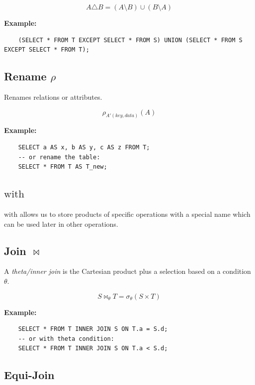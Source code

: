 \[
    A \triangle B = (A \setminus B) \cup (B \setminus A)
\]

\textbf{Example:}

\begin{verbatim}
    (SELECT * FROM T EXCEPT SELECT * FROM S) UNION (SELECT * FROM S EXCEPT SELECT * FROM T);
\end{verbatim}

\subsection{Rename \texorpdfstring{\(\rho\)}{}}

Renames relations or attributes.

\[
    \rho_{A'(key, data)}(A)
\]

\textbf{Example:}

\begin{verbatim}
    SELECT a AS x, b AS y, c AS z FROM T;
    -- or rename the table:
    SELECT * FROM T AS T_new;
\end{verbatim}

\subsection{\texorpdfstring{\(\mathrm{with}\)}{with}}

\(\mathrm{with}\) allows us to store products of specific operations with a special name which can be used later in other operations.

\subsection{Join \texorpdfstring{\(\bowtie\)}{}}

A \emph{theta/inner join} is the Cartesian product plus a selection based on a condition \(\theta\).

\[
    S \bowtie_{\theta } T = \sigma_\theta (S \times T)
\]

\textbf{Example:}

\begin{verbatim}
    SELECT * FROM T INNER JOIN S ON T.a = S.d;
    -- or with theta condition:
    SELECT * FROM T INNER JOIN S ON T.a < S.d;
\end{verbatim}  

\subsection{Equi-Join}

